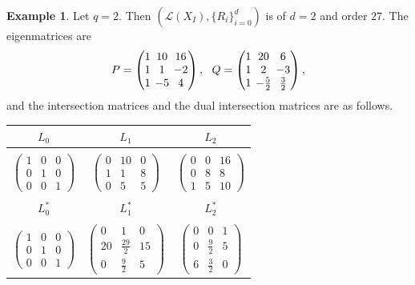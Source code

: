 \documentclass[11pt]{amsart}
\newcommand{\pmat}[1]{\begin{pmatrix} #1 \end{pmatrix}}
\theoremstyle{plain} %
\theoremstyle{definition} %
\newtheorem{ex}[thm]{Example} %
\theoremstyle{remark} %
\begin{document}
\begin{ex}%
Let $q=2$.
Then $(\mathcal{L}(X_I),\{R_i\}_{i=0}^d)$ is of $d=2$ and order $27$. The eigenmatrices are
$$
\setlength{\arraycolsep}{2pt}
P=\pmat{
1 & 10 & 16 \\ 1 & 1 & -2 \\ 1 & -5 & 4
}
,
\ \ 
Q=\pmat{
1 & 20 & 6 \\ 1 & 2 & -3 \\ 1 & -\frac{5}{2} & \frac{3}{2}
},
$$
and the intersection matrices and the dual intersection matrices are as follows.
\begin{table}[H]
  \setlength{\arraycolsep}{1.7pt}
\renewcommand{\arraystretch}{1.0}
  \begin{center}
      \begin{tabular}{ccc}
      \\
           $L_0$&$L_1$&$L_2$\\
\hline%
\\
$\pmat{1&0&0\\0&1&0\\0&0&1}$&$\pmat{0 & 10 & 0 \\ 1 & 1 & 8 \\ 0 & 5 & 5}$&$\pmat{0 & 0 & 16 \\ 0 & 8 & 8 \\ 1 & 5 & 10}$\\
\\
$L^*_0$&$L^*_1$&$L^*_2$\\
\hline%
\\
$\pmat{1&0&0\\0&1&0\\0&0&1}$
&$\pmat{0 & 1 & 0 \\ 20 & \frac{29}{2} & 15 \\ 0 & \frac{9}{2} & 5}$
&$\pmat{0 & 0 & 1 \\ 0 & \frac{9}{2} & 5 \\ 6 & \frac{3}{2} & 0}$
      \end{tabular}
  \end{center}
\end{table}
\end{ex}
\end{document}
